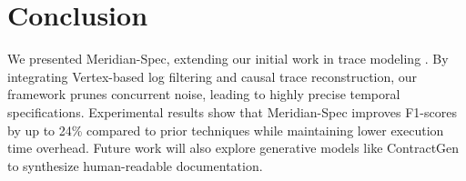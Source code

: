 \section{Conclusion}
We presented Meridian-Spec, extending our initial work in trace modeling \cite{miller2024meridian}. By integrating Vertex-based log filtering and causal trace reconstruction, our framework prunes concurrent noise, leading to highly precise temporal specifications. Experimental results show that Meridian-Spec improves F1-scores by up to 24\% compared to prior techniques while maintaining lower execution time overhead. Future work will also explore generative models like ContractGen \cite{patel2024contractgen} to synthesize human-readable documentation.
